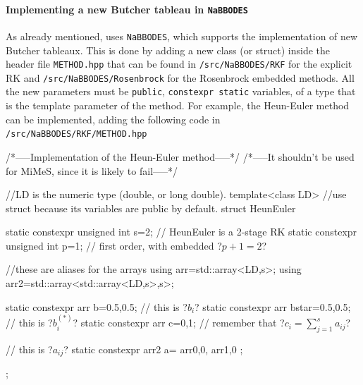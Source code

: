 \documentclass[11pt,a4paper]{article}
\begin{document}
\paragraph{Implementing a new Butcher tableau in {\tt NaBBODES}} As already mentioned, \mimes uses {\tt NaBBODES}, which supports the implementation of new Butcher tableaux. This is done by adding a new class (or struct) inside the header file {\tt METHOD.hpp} that can be found in {\tt \mimes/src/NaBBODES/RKF} for the explicit RK and  {\tt \mimes/src/NaBBODES/Rosenbrock} for the Rosenbrock embedded methods. All the new parameters must be {\tt public},  {\tt constexpr static} variables, of a type that is the template parameter of the method. For example, the Heun-Euler method can be implemented, adding the following code in  {\tt \mimes/src/NaBBODES/RKF/METHOD.hpp}
%
\begin{cpp}
	/*-----Implementation of the Heun-Euler method-----*/
	/*-----It shouldn't be used for MiMeS, since it is likely to fail-----*/
	
	//LD is the numeric type (\ie double, or long double).
	template<class LD>
	//use struct because its variables are public by default.
	struct HeunEuler{  
		static constexpr unsigned int s=2; // HeunEuler is a 2-stage RK
		static constexpr unsigned int p=1; // first order, with embedded ?$p+1=2$?

		//these are aliases for the arrays
		using arr=std::array<LD,s>;
		using arr2=std::array<std::array<LD,s>,s>;
		
		static constexpr arr b={0.5,0.5}; // this is ?$b_i$?
		static constexpr arr bstar={0.5,0.5}; // this is ?$b_i^{(*)}$?
		static constexpr arr c={0,1}; // remember that ?$c_i = \displaystyle\sum_{j=1}^{s} a_{ij}$?
		
		// this is ?$a_{ij}$?
		static constexpr arr2 a={
			arr{0,0},
			arr{1,0}
		};			
	};
\end{cpp}
\end{document}
